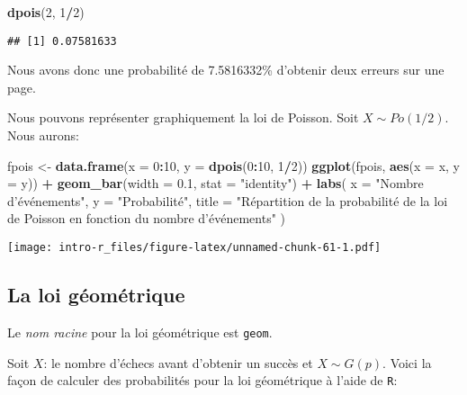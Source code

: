 \documentclass[]{book}
\newenvironment{Shaded}{\begin{snugshade}}{\end{snugshade}}
\newcommand{\KeywordTok}[1]{\textcolor[rgb]{0.13,0.29,0.53}{\textbf{#1}}}
\newcommand{\DataTypeTok}[1]{\textcolor[rgb]{0.13,0.29,0.53}{#1}}
\newcommand{\DecValTok}[1]{\textcolor[rgb]{0.00,0.00,0.81}{#1}}
\newcommand{\FloatTok}[1]{\textcolor[rgb]{0.00,0.00,0.81}{#1}}
\newcommand{\StringTok}[1]{\textcolor[rgb]{0.31,0.60,0.02}{#1}}
\newcommand{\OperatorTok}[1]{\textcolor[rgb]{0.81,0.36,0.00}{\textbf{#1}}}
\newcommand{\NormalTok}[1]{#1}
\begin{document}
\begin{Shaded}
\begin{Highlighting}[]
\KeywordTok{dpois}\NormalTok{(}\DecValTok{2}\NormalTok{, }\DecValTok{1}\OperatorTok{/}\DecValTok{2}\NormalTok{)}
\end{Highlighting}
\end{Shaded}

\begin{verbatim}
## [1] 0.07581633
\end{verbatim}

Nous avons donc une probabilité de 7.5816332\% d'obtenir deux erreurs
sur une page.

Nous pouvons représenter graphiquement la loi de Poisson. Soit
\(X\sim Po(1/2)\). Nous aurons:

\begin{Shaded}
\begin{Highlighting}[]
\NormalTok{fpois <-}\StringTok{ }\KeywordTok{data.frame}\NormalTok{(}\DataTypeTok{x =} \DecValTok{0}\OperatorTok{:}\DecValTok{10}\NormalTok{, }\DataTypeTok{y =} \KeywordTok{dpois}\NormalTok{(}\DecValTok{0}\OperatorTok{:}\DecValTok{10}\NormalTok{, }\DecValTok{1}\OperatorTok{/}\DecValTok{2}\NormalTok{))}
\KeywordTok{ggplot}\NormalTok{(fpois, }\KeywordTok{aes}\NormalTok{(}\DataTypeTok{x =}\NormalTok{ x, }\DataTypeTok{y =}\NormalTok{ y)) }\OperatorTok{+}
\StringTok{  }\KeywordTok{geom_bar}\NormalTok{(}\DataTypeTok{width =} \FloatTok{0.1}\NormalTok{, }\DataTypeTok{stat =} \StringTok{"identity"}\NormalTok{) }\OperatorTok{+}
\StringTok{  }\KeywordTok{labs}\NormalTok{(}
    \DataTypeTok{x =} \StringTok{"Nombre d'événements"}\NormalTok{,}
    \DataTypeTok{y =} \StringTok{"Probabilité"}\NormalTok{,}
    \DataTypeTok{title =} \StringTok{"Répartition de la probabilité de la loi de Poisson en fonction du nombre d'événements"}
\NormalTok{  )}
\end{Highlighting}
\end{Shaded}

\texttt{[image: intro-r\_files/figure-latex/unnamed-chunk-61-1.pdf]}

\subsection{La loi géométrique}\label{la-loi-geometrique}

Le \emph{nom racine} pour la loi géométrique est \texttt{geom}.

Soit \(X\): le nombre d'échecs avant d'obtenir un succès et
\(X\sim G(p)\). Voici la façon de calculer des probabilités pour la loi
géométrique à l'aide de \texttt{R}:
\end{document}
